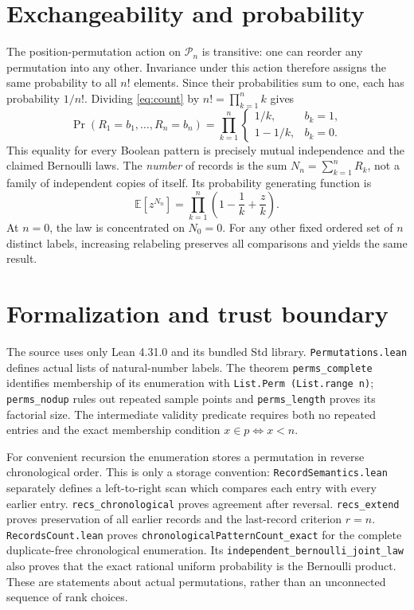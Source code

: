 \documentclass[11pt]{article}
\begin{document}
\section{Exchangeability and probability}
The position-permutation action on $\mathcal P_n$ is transitive: one can
reorder any permutation into any other. Invariance under this action
therefore assigns the same probability to all $n!$ elements. Since their
probabilities sum to one, each has probability $1/n!$. Dividing
\eqref{eq:count} by $n!=\prod_{k=1}^n k$ gives
\[
 \Pr(R_1=b_1,\ldots,R_n=b_n)
 =\prod_{k=1}^n
 \begin{cases}1/k,&b_k=1,\\1-1/k,&b_k=0.\end{cases}
\]
This equality for every Boolean pattern is precisely mutual independence
and the claimed Bernoulli laws. The \emph{number} of records is the sum
$N_n=\sum_{k=1}^nR_k$, not a family of independent copies of itself. Its
probability generating function is
\[
 \mathbb E[z^{N_n}]=\prod_{k=1}^n\left(1-\frac1k+\frac zk\right).
\]
At $n=0$, the law is concentrated on $N_0=0$. For any other fixed ordered
set of $n$ distinct labels, increasing relabeling preserves all comparisons
and yields the same result.
\clearpage
\section{Formalization and trust boundary}
The source uses only Lean 4.31.0 and its bundled Std library.
\texttt{Permutations.lean} defines actual lists of natural-number labels.
The theorem \texttt{perms\_complete} identifies membership of its enumeration
with \texttt{List.Perm (List.range n)}; \texttt{perms\_nodup} rules out
repeated sample points and \texttt{perms\_length} proves its factorial size.
The intermediate validity predicate requires both no repeated entries
and the exact membership condition $x\in p\iff x<n$.

For convenient recursion the enumeration stores a permutation in reverse
chronological order. This is only a storage convention:
\texttt{RecordSemantics.lean} separately defines a left-to-right scan which
compares each entry with every earlier entry.
\texttt{recs\_chronological} proves agreement after reversal.
\texttt{recs\_extend} proves preservation of all earlier records and the
last-record criterion $r=n$. \texttt{RecordsCount.lean} proves \texttt{chronologicalPatternCount\_exact} for the complete duplicate-free chronological enumeration. Its \texttt{independent\_bernoulli\_joint\_law} also proves that the exact rational uniform probability is the Bernoulli product. These are statements about actual permutations, rather than an unconnected sequence of rank choices.
\end{document}
